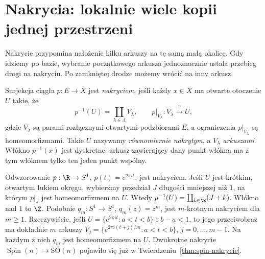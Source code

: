 \section{Nakrycia: lokalnie wiele kopii jednej przestrzeni}
\label{sec:nakrycia}

Nakrycie przypomina nałożenie kilku arkuszy
na tę samą małą okolicę. Gdy idziemy po bazie,
wybranie początkowego arkusza jednoznacznie
ustala przebieg drogi na nakryciu.
Po zamkniętej drodze możemy wrócić na inny arkusz.

\begin{definicja}
\label{def:nakrycie}
Surjekcja ciągła $p:E\to X$ jest \emph{nakryciem},
jeśli każdy $x\in X$ ma otwarte otoczenie $U$
takie, że
\[
 p^{-1}(U)=\coprod_{\lambda\in\Lambda}V_\lambda,
 \qquad
 p|_{V_\lambda}:V_\lambda\xrightarrow{\cong}U,
\]
gdzie $V_\lambda$ są parami rozłącznymi
otwartymi podzbiorami $E$, a ograniczenia $p|_{V_\lambda}$
są homeomorfizmami.
Takie $U$ nazywamy \emph{równomiernie nakrytym},
a $V_\lambda$ \emph{arkuszami}.
Włókno $p^{-1}(x)$ jest dyskretne: arkusz zawierający
dany punkt włókna ma z tym włóknem tylko ten jeden
punkt wspólny.
\end{definicja}

\begin{przyklad}
\label{prz:exp-nakrycie}
Odwzorowanie $p:\R\to S^1$, $p(t)=e^{2\pi i t}$,
jest nakryciem. Jeśli $U$ jest krótkim,
otwartym łukiem okręgu, wybierzmy przedział
$J$ długości mniejszej niż $1$, na którym
$p|_J$ jest homeomorfizmem na $U$.
Wtedy $p^{-1}(U)=\coprod_{k\in\Z}(J+k)$.
Włókno nad $1$ to $\Z$.
Podobnie $q_m:S^1\to S^1$, $q_m(z)=z^m$,
jest $m$-krotnym nakryciem dla $m\geq1$.
Rzeczywiście, jeśli
$U=\{e^{2\pi it}:a<t<b\}$ i $b-a<1$,
to jego przeciwobraz ma dokładnie $m$ arkuszy
$V_j=\{e^{2\pi i(t+j)/m}:a<t<b\}$,
$j=0,\ldots,m-1$. Na każdym z nich $q_m$
jest homeomorfizmem na $U$.
Dwukrotne nakrycie $\operatorname{Spin}(n)
\to\mathrm{SO}(n)$ pojawiło się już w
Twierdzeniu~\ref{thm:spin-nakrycie}.
\end{przyklad}

